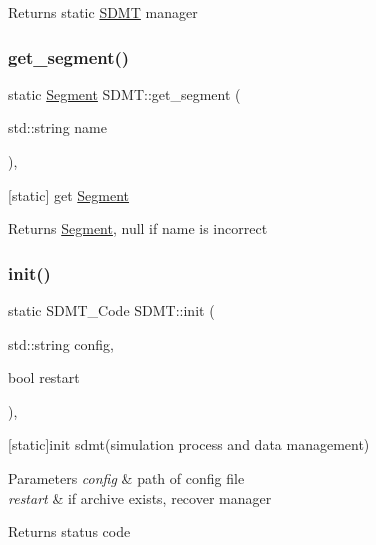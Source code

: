 \begin{DoxyReturn}{Returns}
static \hyperlink{class_s_d_m_t}{S\+D\+MT} manager 
\end{DoxyReturn}
\mbox{\label{class_s_d_m_t_a8dfbf78068663cc21ff1e7f15fca6e55}} 
\subsubsection{\texorpdfstring{get\+\_\+segment()}{get\_segment()}}
{\footnotesize\ttfamily static \hyperlink{struct_s_d_m_t_1_1_segment}{Segment} S\+D\+M\+T\+::get\+\_\+segment (\begin{DoxyParamCaption}\item[{std\+::string}]{name }\end{DoxyParamCaption})\hspace{0.3cm}{\ttfamily [inline]}, {\ttfamily [static]}}



\mbox{[}static\mbox{]} get \hyperlink{struct_s_d_m_t_1_1_segment}{Segment} 

\begin{DoxyReturn}{Returns}
\hyperlink{struct_s_d_m_t_1_1_segment}{Segment}, null if name is incorrect 
\end{DoxyReturn}
\mbox{\label{class_s_d_m_t_a234a8848281f756b8a76dcf2b69fb343}} 
\subsubsection{\texorpdfstring{init()}{init()}}
{\footnotesize\ttfamily static S\+D\+M\+T\+\_\+\+Code S\+D\+M\+T\+::init (\begin{DoxyParamCaption}\item[{std\+::string}]{config,  }\item[{bool}]{restart }\end{DoxyParamCaption})\hspace{0.3cm}{\ttfamily [inline]}, {\ttfamily [static]}}



\mbox{[}static\mbox{]}init sdmt(simulation process and data management) 


\begin{DoxyParams}{Parameters}
{\em config} & path of config file \\
\hline
{\em restart} & if archive exists, recover manager \\
\hline
\end{DoxyParams}
\begin{DoxyReturn}{Returns}
status code 
\end{DoxyReturn}
\mbox{\label{class_s_d_m_t_a31a70a690a9215643afaf9ef1abb35f1}} 
